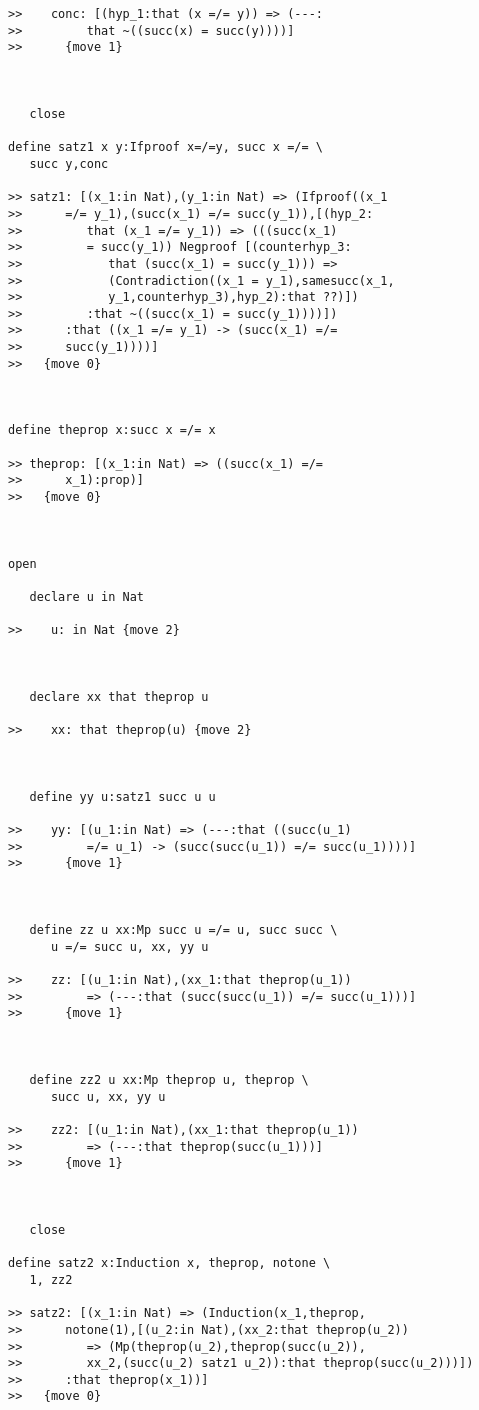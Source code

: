 \begin{verbatim}
>>    conc: [(hyp_1:that (x =/= y)) => (---:
>>         that ~((succ(x) = succ(y))))]
>>      {move 1}



   close

define satz1 x y:Ifproof x=/=y, succ x =/= \
   succ y,conc

>> satz1: [(x_1:in Nat),(y_1:in Nat) => (Ifproof((x_1
>>      =/= y_1),(succ(x_1) =/= succ(y_1)),[(hyp_2:
>>         that (x_1 =/= y_1)) => (((succ(x_1)
>>         = succ(y_1)) Negproof [(counterhyp_3:
>>            that (succ(x_1) = succ(y_1))) =>
>>            (Contradiction((x_1 = y_1),samesucc(x_1,
>>            y_1,counterhyp_3),hyp_2):that ??)])
>>         :that ~((succ(x_1) = succ(y_1))))])
>>      :that ((x_1 =/= y_1) -> (succ(x_1) =/=
>>      succ(y_1))))]
>>   {move 0}



define theprop x:succ x =/= x

>> theprop: [(x_1:in Nat) => ((succ(x_1) =/=
>>      x_1):prop)]
>>   {move 0}



open

   declare u in Nat

>>    u: in Nat {move 2}



   declare xx that theprop u

>>    xx: that theprop(u) {move 2}



   define yy u:satz1 succ u u

>>    yy: [(u_1:in Nat) => (---:that ((succ(u_1)
>>         =/= u_1) -> (succ(succ(u_1)) =/= succ(u_1))))]
>>      {move 1}



   define zz u xx:Mp succ u =/= u, succ succ \
      u =/= succ u, xx, yy u

>>    zz: [(u_1:in Nat),(xx_1:that theprop(u_1))
>>         => (---:that (succ(succ(u_1)) =/= succ(u_1)))]
>>      {move 1}



   define zz2 u xx:Mp theprop u, theprop \
      succ u, xx, yy u

>>    zz2: [(u_1:in Nat),(xx_1:that theprop(u_1))
>>         => (---:that theprop(succ(u_1)))]
>>      {move 1}



   close

define satz2 x:Induction x, theprop, notone \
   1, zz2

>> satz2: [(x_1:in Nat) => (Induction(x_1,theprop,
>>      notone(1),[(u_2:in Nat),(xx_2:that theprop(u_2))
>>         => (Mp(theprop(u_2),theprop(succ(u_2)),
>>         xx_2,(succ(u_2) satz1 u_2)):that theprop(succ(u_2)))])
>>      :that theprop(x_1))]
>>   {move 0}




\end{verbatim}
